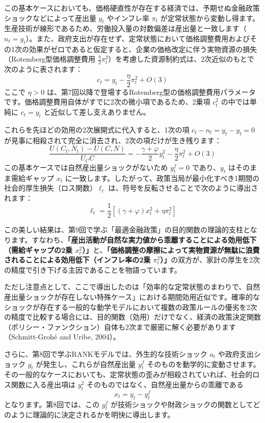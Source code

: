 \documentclass[
  japanese,
  lualatex,
  ja=standard,
  12pt,
  a4paper]{ltjsarticle}
\begin{document}
この基本ケースにおいても、価格硬直性が存在する経済では、予期せぬ金融政策ショックなどによって産出量
\(y_t\) やインフレ率 \(\pi_t\)
が定常状態から変動し得ます。生産技術が線形であるため、労働投入量の対数偏差は産出量と一致します（\(n_t=y_t\)）。また、政府支出が存在せず、定常状態において価格調整費用およびその1次の効果がゼロであると仮定すると、企業の価格改定に伴う実物資源の損失（Rotemberg型価格調整費用
\(\frac{\eta}{2}\pi_t^2\)）を考慮した資源制約式は、2次近似のもとで次のように表されます：
\[
c_t
=
y_t-\frac{\eta}{2}\pi_t^2+O(3)
\] ここで \(\eta>0\)
は、第7回以降で登場するRotemberg型の価格調整費用パラメータです。価格調整費用自体がすでに2次の微小項であるため、2乗項
\(c_t^2\) の中では単純に \(c_t=y_t\) と近似して差し支えありません。

これらを先ほどの効用の2次展開式に代入すると、1次の項
\(c_t - n_t = y_t - y_t = 0\)
が見事に相殺されて完全に消去され、2次の項だけが生き残ります： \[
\frac{U(C_t,N_t)-U(C,N)}{U_C C}
=
-\frac{\gamma+\varphi}{2}y_t^2
-\frac{\eta}{2}\pi_t^2
+O(3)
\] この基本ケースでは自然産出量ショックがないため \(y_t^f=0\)
であり、\(y_t\) はそのまま需給ギャップ \(x_t\)
に一致します。したがって、政策当局が最小化すべき1期間の社会的厚生損失（ロス関数）\(\ell_t\)
は、符号を反転させることで次のように導出されます： \[
\ell_t
=
\frac{1}{2}
\left[
(\gamma+\varphi)x_t^2+\eta\pi_t^2
\right]
\]

この美しい結果は、第9回で学ぶ「最適金融政策」の目的関数の理論的支柱となります。すなわち、\textbf{「産出活動が自然な実力値から乖離することによる効用低下（需給ギャップの2乗
\(x_t^2\)）」}と、\textbf{「価格調整の摩擦によって実物資源が無駄に浪費されることによる効用低下（インフレ率の2乗
\(\pi_t^2\)）」}の双方が、家計の厚生を2次の精度で引き下げる主因であることを物語っています。

ただし注意点として、ここで導出したのは「効率的な定常状態のまわりで、自然産出量ショックが存在しない特殊ケース」における期間効用近似です。確率的なショックが存在する一般的な動学モデルにおいて複数の政策ルールの優劣を2次の精度で比較する場合には、目的関数（効用）だけでなく、経済の政策決定関数（ポリシー・ファンクション）自体も2次まで厳密に解く必要があります（Schmitt-Grohé
and Uribe, 2004）。

さらに、第8回で学ぶRANKモデルでは、外生的な技術ショック \(a_t\)
や政府支出ショック \(g_t\) が発生し、これらが自然産出量 \(y_t^f\)
そのものを動学的に変動させます。その一般的なケースにおいても、定常状態の歪みが相殺されていれば、社会的ロス関数に入る産出項は
\(y_t^2\) そのものではなく、自然産出量からの乖離である \[
x_t=y_t-y_t^f
\] となります。第8回では、この \(y_t^f\)
が技術ショックや財政ショックの関数としてどのように理論的に決定されるかを明快に導出します。
\end{document}
